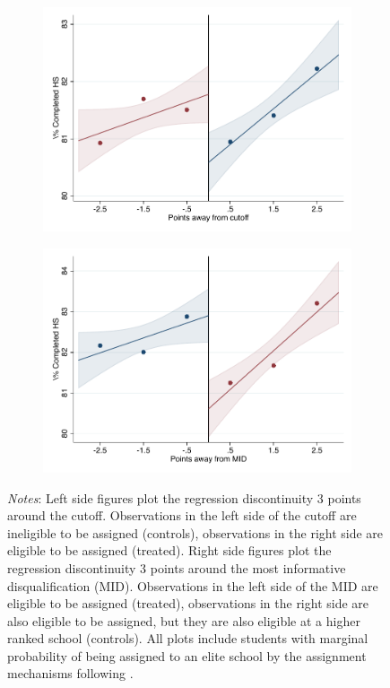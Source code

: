 \documentclass[oneside,11pt]{article}
\begin{document}
\begin{figure}[H]
\begin{center}
    \begin{subfigure}{0.475\textwidth}
        \centering
        \includegraphics[width=\textwidth]{04_Figures/rd_plot_tau_bachillerato_mas_UNAM3.pdf}
    \end{subfigure}
    \begin{subfigure}{0.475\textwidth}
        \centering
        \includegraphics[width=\textwidth]{04_Figures/rd_plot_mid_bachillerato_mas_UNAM3.pdf}
    \end{subfigure}
    \end{center}
    
\footnotesize
\textit{Notes}: Left side figures plot the regression discontinuity 3 points around the cutoff. Observations in the left side of the cutoff are ineligible to be assigned (controls), observations in the right side are eligible to be assigned (treated). Right side figures plot the regression discontinuity 3 points around the most informative disqualification (MID). Observations in the left side of the MID are eligible to be assigned (treated), observations in the right side are also eligible to be assigned, but they are also eligible at a higher ranked school (controls). All plots include students with marginal probability of being assigned to an elite school by the assignment mechanisms following \citet{abdulkadirouglu2022breaking}. 
\end{figure}
\end{document}

